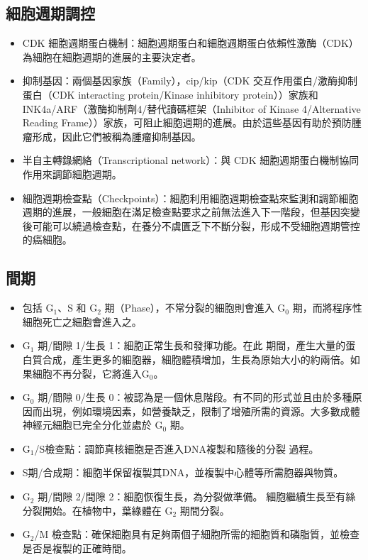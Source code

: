 \documentclass[a4paper,12pt]{report}
\begin{document}
\subsection{細胞週期調控}
\begin{itemize}
  \item CDK 細胞週期蛋白機制：細胞週期蛋白和細胞週期蛋白依賴性激酶（CDK）為細胞在細胞週期的進展的主要決定者。
  \item 抑制基因：兩個基因家族（Family），cip/kip（CDK 交互作用蛋白/激酶抑制蛋白（CDK interacting protein/Kinase inhibitory protein））家族和 INK4a/ARF（激酶抑制劑4/替代讀碼框架（Inhibitor of Kinase 4/Alternative Reading Frame））家族，可阻止細胞週期的進展。由於這些基因有助於預防腫瘤形成，因此它們被稱為腫瘤抑制基因。
  \item 半自主轉錄網絡（Transcriptional network）：與 CDK 細胞週期蛋白機制協同作用來調節細胞週期。
  \item 細胞週期檢查點（Checkpoints）：細胞利用細胞週期檢查點來監測和調節細胞週期的進展，一般細胞在滿足檢查點要求之前無法進入下一階段，但基因突變後可能可以繞過檢查點，在養分不虞匱乏下不斷分裂，形成不受細胞週期管控的癌細胞。
\end{itemize}
\subsection{間期}
\begin{itemize}
  \item 包括 G$_1$、S 和 G$_2$ 期（Phase），不常分裂的細胞則會進入 G$_0$ 期，而將程序性細胞死亡之細胞會進入之。
  \item G$_1$ 期/間隙 1/生長 1：細胞正常生長和發揮功能。在此 期間，產生大量的蛋白質合成，產生更多的細胞器，細胞體積增加，生長為原始大小的約兩倍。如果細胞不再分裂，它將進入G$_0$。
  \item G$_0$ 期/間隙 0/生長 0：被認為是一個休息階段。有不同的形式並且由於多種原因而出現，例如環境因素，如營養缺乏，限制了增殖所需的資源。大多數成體神經元細胞已完全分化並處於 G$_0$ 期。
  \item G$_1$/S檢查點：調節真核細胞是否進入DNA複製和隨後的分裂 過程。
  \item S期/合成期：細胞半保留複製其DNA，並複製中心體等所需胞器與物質。
  \item G$_2$ 期/間隙 2/間隙 2：細胞恢復生長，為分裂做準備。 細胞繼續生長至有絲分裂開始。在植物中，葉綠體在 G$_2$ 期間分裂。
  \item G$_2$/M 檢查點：確保細胞具有足夠兩個子細胞所需的細胞質和磷脂質，並檢查是否是複製的正確時間。
\end{itemize}
\end{document}
